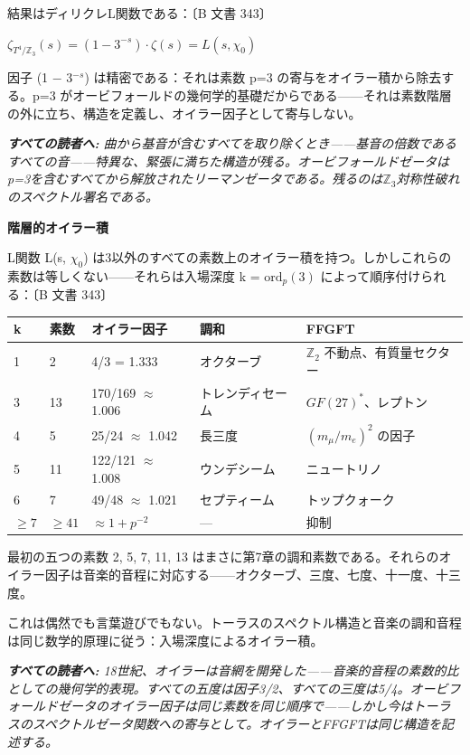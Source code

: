 \documentclass[11pt,openany]{book}
\newenvironment{laierspur}{%
  \par\vspace{4pt}%
  \noindent\small\itshape\color{blue!60!black}%
  \textbf{すべての読者へ:}\enspace\ignorespaces}{%
  \par\vspace{4pt}\normalsize\normalfont\normalcolor}
\begin{document}
結果はディリクレL関数である：〔B 文書 343〕

$\zeta_{T^4/\mathbb{Z}_3}(s) = (1-3^{-s})\cdot\zeta(s) = L(s,\chi_0)$

因子 (1 $-$ 3$^{-s}$) は精密である：それは素数 p=3 の寄与をオイラー積から除去する。p=3 がオービフォールドの幾何学的基礎だからである——それは素数階層の外に立ち、構造を定義し、オイラー因子として寄与しない。

\begin{laierspur}
曲から基音が含むすべてを取り除くとき——基音の倍数であるすべての音——特異な、緊張に満ちた構造が残る。オービフォールドゼータはp=3を含むすべてから解放されたリーマンゼータである。残るのは$\mathbb{Z}_3$対称性破れのスペクトル署名である。
\end{laierspur}

\textbf{階層的オイラー積}

L関数 L(s, $\chi_0$) は3以外のすべての素数上のオイラー積を持つ。しかしこれらの素数は等しくない——それらは入場深度 k = $\text{ord}_p(3)$ によって順序付けられる：〔B 文書 343〕

\begin{tabular}{lllll}
\toprule
k & 素数 & オイラー因子 & 調和 & FFGFT \\
\midrule
1 & 2 & 4/3 = 1.333 & オクターブ & $\mathbb{Z}_2$ 不動点、有質量セクター \\
3 & 13 & 170/169 $\approx$ 1.006 & トレンディセーム & $GF(27)^*$、レプトン \\
4 & 5 & 25/24 $\approx$ 1.042 & 長三度 & $(m_\mu/m_e)^2$ の因子 \\
5 & 11 & 122/121 $\approx$ 1.008 & ウンデシーム & ニュートリノ \\
6 & 7 & 49/48 $\approx$ 1.021 & セプティーム & トップクォーク \\
${\geq}7$ & ${\geq}41$ & ${\approx}1{+}p^{-2}$ & --- & 抑制 \\
\bottomrule
\end{tabular}

最初の五つの素数 {2, 5, 7, 11, 13} はまさに第7章の調和素数である。それらのオイラー因子は音楽的音程に対応する——オクターブ、三度、七度、十一度、十三度。

これは偶然でも言葉遊びでもない。トーラスのスペクトル構造と音楽の調和音程は同じ数学的原理に従う：入場深度によるオイラー積。

\begin{laierspur}
18世紀、オイラーは音網を開発した——音楽的音程の素数的比としての幾何学的表現。すべての五度は因子3/2、すべての三度は5/4。オービフォールドゼータのオイラー因子は同じ素数を同じ順序で——しかし今はトーラスのスペクトルゼータ関数への寄与として。オイラーとFFGFTは同じ構造を記述する。
\end{laierspur}
\end{document}
